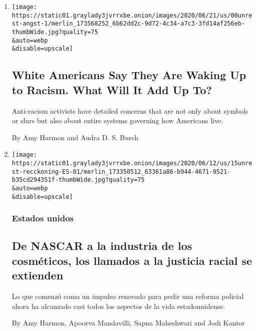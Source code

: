 \begin{enumerate}
\def\labelenumi{\arabic{enumi}.}
\item
  \href{/2020/06/22/us/racism-white-americans.html}{}

  \texttt{[image: https://static01.graylady3jvrrxbe.onion/images/2020/06/21/us/00unrest-angst-1/merlin\_173568252\_6b62dd2c-9d72-4c34-a7c3-3fd14af256eb-thumbWide.jpg?quality=75\\\&auto=webp\\\&disable=upscale]}

  \hypertarget{white-americans-say-they-are-waking-up-to-racism-what-will-it-add-up-to}{%
  \subsection{White Americans Say They Are Waking Up to Racism. What
  Will It Add Up
  To?}\label{white-americans-say-they-are-waking-up-to-racism-what-will-it-add-up-to}}

  Anti-racism activists have detailed concerns that are not only about
  symbols or slurs but also about entire systems governing how Americans
  live.

  By Amy Harmon and Audra D. S. Burch
\item
  \href{/es/2020/06/15/espanol/mundo/racismo-george-floyd-protestas.html}{}

  \texttt{[image: https://static01.graylady3jvrrxbe.onion/images/2020/06/12/us/15unrest-recckoning-ES-01/merlin\_173350512\_63361a86-b944-4671-9521-b35cd294351f-thumbWide.jpg?quality=75\\\&auto=webp\\\&disable=upscale]}

  \hypertarget{estados-unidos}{%
  \subsubsection{Estados unidos}\label{estados-unidos}}

  \hypertarget{de-nascar-a-la-industria-de-los-cosmuxe9ticos-los-llamados-a-la-justicia-racial-se-extienden}{%
  \subsection{De NASCAR a la industria de los cosméticos, los llamados a
  la justicia racial se
  extienden}\label{de-nascar-a-la-industria-de-los-cosmuxe9ticos-los-llamados-a-la-justicia-racial-se-extienden}}

  Lo que comenzó como un impulso renovado para pedir una reforma
  policial ahora ha alcanzado casi todos los aspectos de la vida
  estadounidense.

  By Amy Harmon, Apoorva Mandavilli, Sapna Maheshwari and Jodi Kantor


\end{enumerate}
